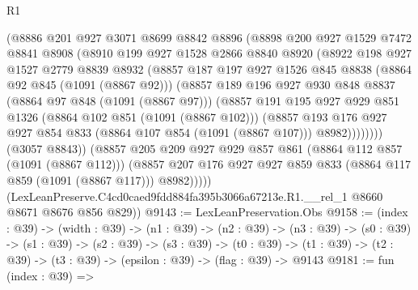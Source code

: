 \begin{lexlean}{R1}
\begin{coremodule}
              (@8886
                @201
                @927
                @3071
                @8699
                @8842
                @8896
                (@8898
                  @200
                  @927
                  @1529
                  @7472
                  @8841
                  @8908
                  (@8910
                    @199
                    @927
                    @1528
                    @2866
                    @8840
                    @8920
                    (@8922
                      @198
                      @927
                      @1527
                      @2779
                      @8839
                      @8932
                      (@8857
                        @187
                        @197
                        @927
                        @1526
                        @845
                        @8838
                        (@8864 @92 @845 (@1091 (@8867 @92)))
                        (@8857
                          @189
                          @196
                          @927
                          @930
                          @848
                          @8837
                          (@8864 @97 @848 (@1091 (@8867 @97)))
                          (@8857
                            @191
                            @195
                            @927
                            @929
                            @851
                            @1326
                            (@8864 @102 @851 (@1091 (@8867 @102)))
                            (@8857
                              @193
                              @176
                              @927
                              @927
                              @854
                              @833
                              (@8864 @107 @854 (@1091 (@8867 @107)))
                              @8982))))))))
              (@3057 @8843))
            (@8857
              @205
              @209
              @927
              @929
              @857
              @861
              (@8864 @112 @857 (@1091 (@8867 @112)))
              (@8857 @207 @176 @927 @927 @859 @833 (@8864 @117 @859 (@1091 (@8867 @117))) @8982)))))
      (LexLeanPreserve.C4cd0caed9fdd884fa395b3066a67213e.R1.__rel_1 @8660 @8671 @8676 @856 @829))
@9143 := LexLeanPreservation.Obs
@9158 := (index : @39) ->
  (width : @39) ->
  (n1 : @39) ->
  (n2 : @39) ->
  (n3 : @39) ->
  (s0 : @39) ->
  (s1 : @39) ->
  (s2 : @39) ->
  (s3 : @39) ->
  (t0 : @39) -> (t1 : @39) -> (t2 : @39) -> (t3 : @39) -> (epsilon : @39) -> (flag : @39) -> @9143
@9181 := fun (index : @39) =>

\end{coremodule}
\end{lexlean}
